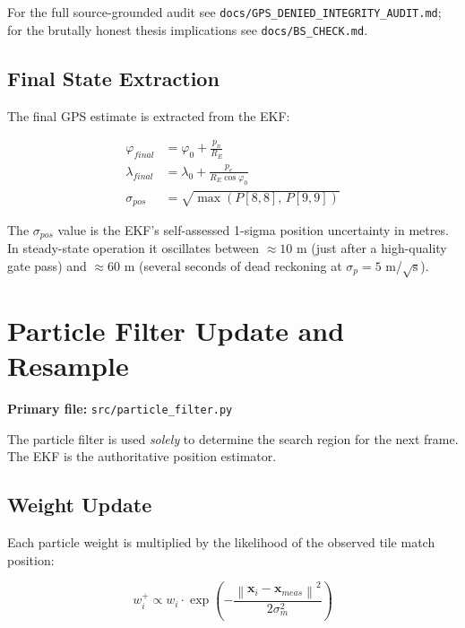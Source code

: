\documentclass[12pt,a4paper]{article}
\newcommand{\norm}[1]{\left\lVert#1\right\rVert}
\newcommand{\bx}{\mathbf{x}}
\begin{document}
For the full source-grounded audit see
\texttt{docs/GPS\_DENIED\_INTEGRITY\_AUDIT.md}; for the brutally honest thesis
implications see \texttt{docs/BS\_CHECK.md}.

\subsection{Final State Extraction}

The final GPS estimate is extracted from the EKF:

\begin{align}
    \varphi_{final} &= \varphi_0 + \frac{p_n}{R_E}
    \label{eq:final_lat} \\
    \lambda_{final} &= \lambda_0 + \frac{p_e}{R_E\cos\varphi_0}
    \label{eq:final_lon} \\
    \sigma_{pos} &= \sqrt{\max(P[8,8],\, P[9,9])}
    \label{eq:sigma_pos}
\end{align}

The $\sigma_{pos}$ value is the EKF's self-assessed 1-sigma position
uncertainty in metres. In steady-state operation it oscillates between
$\approx 10$ m (just after a high-quality gate pass) and $\approx 60$ m
(several seconds of dead reckoning at $\sigma_p = 5$ m/$\sqrt{\text{s}}$).

\section{Particle Filter Update and Resample}

\noindent\textbf{Primary file:} \texttt{src/particle\_filter.py}

The particle filter is used \emph{solely} to determine the search region for
the next frame. The EKF is the authoritative position estimator.

\subsection{Weight Update}

Each particle weight is multiplied by the likelihood of the observed tile
match position:

\begin{equation}
    w_i^+ \propto w_i \cdot
    \exp\!\left(-\frac{\norm{\bx_i - \bx_{meas}}^2}{2\sigma_m^2}\right)
    \label{eq:pf_update}
\end{equation}
\end{document}
